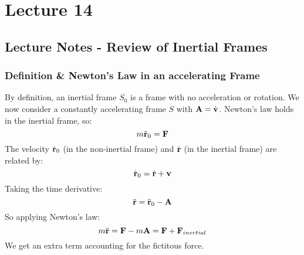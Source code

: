\section{Lecture 14}
\subsection{Lecture Notes - Review of Inertial Frames}
\subsubsection{Definition \& Newton's Law in an accelerating Frame}
By definition, an inertial frame $S_0$ is a frame with no acceleration or rotation. We now consider a constantly accelerating frame $S$ with $\mathbf{A} = \dot{\mathbf{v}}$. Newton's law holds in the inertial frame, so:
\[m\ddot{\mathbf{r}}_0 = \mathbf{F}\]
The velocity $\dot{\mathbf{r}}_0$ (in the non-inertial frame) and $\dot{\mathbf{r}}$ (in the inertial frame) are related by:
\[\dot{\mathbf{r}}_0 = \dot{\mathbf{r}} + \mathbf{v}\]
Taking the time derivative:
\[\ddot{\mathbf{r}} = \ddot{\mathbf{r}}_0 - \mathbf{A}\]
So applying Newton's law:
\[m\ddot{\mathbf{r}} = \mathbf{F} - m\mathbf{A} = \mathbf{F} + \mathbf{F}_{inertial}\]
We get an extra term accounting for the fictitous force.